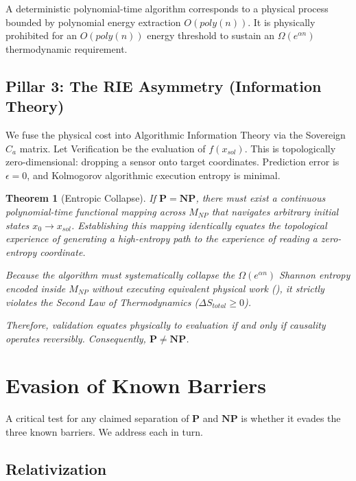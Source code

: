 \documentclass[12pt, a4paper]{article}
\newcommand{\Pc}{\mathbf{P}}
\newcommand{\NPc}{\mathbf{NP}}
\theoremstyle{plain}
\newtheorem{theorem}{Theorem}[section]
\theoremstyle{definition}
\theoremstyle{remark}
\begin{document}
A deterministic polynomial-time algorithm corresponds to a physical process bounded by polynomial energy extraction $O(poly(n))$. It is physically prohibited for an $O(poly(n))$ energy threshold to sustain an $\Omega(e^{\alpha n})$ thermodynamic requirement.

\subsection{Pillar 3: The RIE Asymmetry (Information Theory)}

We fuse the physical cost into Algorithmic Information Theory via the Sovereign $C_a$ matrix. Let Verification be the evaluation of $f(x_{sol})$. This is topologically zero-dimensional: dropping a sensor onto target coordinates. Prediction error is $\epsilon = 0$, and Kolmogorov algorithmic execution entropy is minimal.

\begin{theorem}[Entropic Collapse]\label{thm:main}
If $\Pc = \NPc$, there must exist a continuous polynomial-time functional mapping across $M_{NP}$ that navigates arbitrary initial states $x_0 \to x_{sol}$. Establishing this mapping identically equates the topological experience of \emph{generating} a high-entropy path to the experience of \emph{reading} a zero-entropy coordinate. 

Because the algorithm must systematically collapse the $\Omega(e^{\alpha n})$ Shannon entropy encoded inside $M_{NP}$ without executing equivalent physical work (), it strictly violates the Second Law of Thermodynamics ($\Delta S_{total} \geq 0$). 

Therefore, validation equates physically to evaluation if and only if causality operates reversibly. Consequently, $\Pc \neq \NPc$.
\end{theorem}

\section{Evasion of Known Barriers}\label{sec:barriers}

A critical test for any claimed separation of $\Pc$ and $\NPc$ is whether
it evades the three known barriers. We address each in turn.

\subsection{Relativization}
\end{document}
